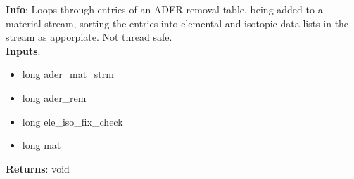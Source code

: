 \textbf{Info}: Loops through entries of an ADER removal table, being added to 
a material stream, sorting the entries into elemental and isotopic data lists
in the stream as apporpiate. Not thread safe. \\

\noindent \textbf{Inputs}:
\begin{itemize}
\item{long ader\_mat\_strm}
\item{long ader\_rem}
\item{long ele\_iso\_fix\_check}
\item{long mat}
\end{itemize}

\noindent \textbf{Returns}: void
